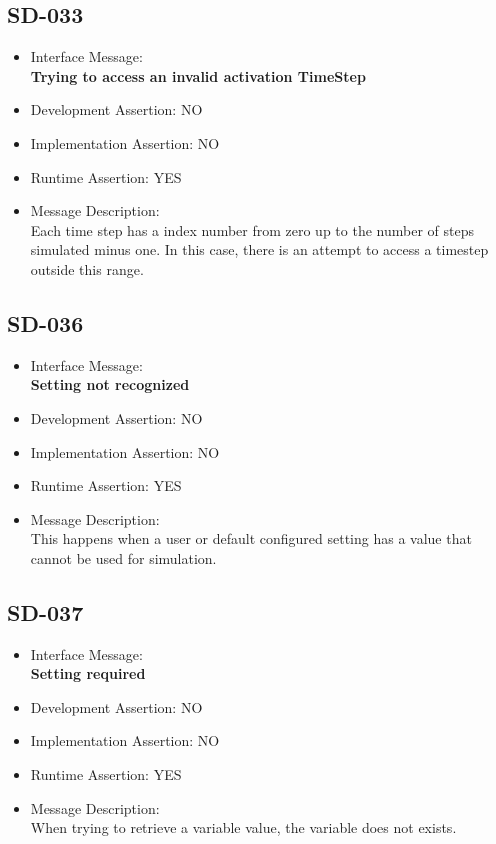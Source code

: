\subsection{SD-033}
\begin{itemize}
  \item Interface Message:\\[1em]
    \textbf{Trying to access an invalid activation TimeStep}
  \item Development Assertion: NO
  \item Implementation Assertion: NO
  \item Runtime Assertion: YES
  \item Message Description:\\[1em]
    Each time step has a index number from zero up to the number of steps simulated minus one. In this case, there is an attempt to access a timestep outside this range.
\end{itemize}

\subsection{SD-036}
\begin{itemize}
  \item Interface Message:\\[1em]
    \textbf{Setting not recognized}
  \item Development Assertion: NO
  \item Implementation Assertion: NO
  \item Runtime Assertion: YES
  \item Message Description:\\[1em]
    This happens when a user or default configured setting has a value that cannot be used for simulation.
\end{itemize}

\subsection{SD-037}
\begin{itemize}
  \item Interface Message:\\[1em]
    \textbf{Setting required}
  \item Development Assertion: NO
  \item Implementation Assertion: NO
  \item Runtime Assertion: YES
  \item Message Description:\\[1em]
    When trying to retrieve a variable value, the variable does not exists.
\end{itemize}

